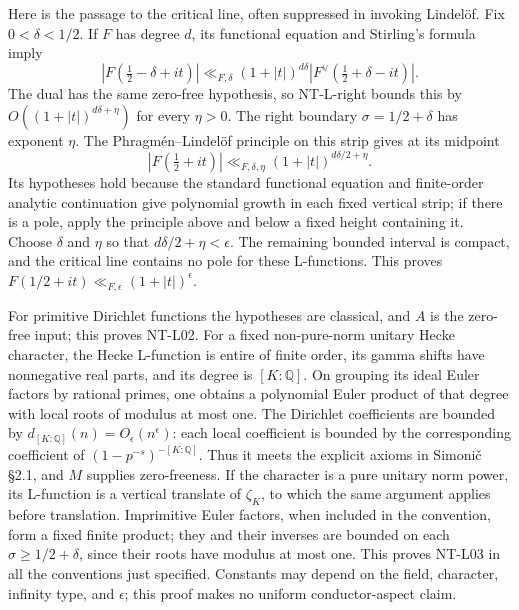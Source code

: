 \documentclass[11pt,a4paper]{article}
\begin{document}
Here is the passage to the critical line, often suppressed in invoking
Lindel\"of.  Fix $0<\delta<1/2$.  If $F$ has degree $d$, its functional
equation and Stirling's formula imply
\[
 |F(\tfrac12-\delta+it)|
 \ll_{F,\delta}(1+|t|)^{d\delta}
       |F^\vee(\tfrac12+\delta-it)|.
\]
The dual has the same zero-free hypothesis, so NT-L-right bounds this by
$O((1+|t|)^{d\delta+\eta})$ for every $\eta>0$.  The right boundary
$\sigma=1/2+\delta$ has exponent $\eta$.
The Phragm\'en--Lindel\"of principle on this strip gives at its midpoint
\[
 |F(\tfrac12+it)|\ll_{F,\delta,\eta}
                       (1+|t|)^{d\delta/2+\eta}.
\]
Its hypotheses hold because the standard functional equation and
finite-order analytic continuation give polynomial growth in each fixed
vertical strip; if there is a pole, apply the principle above and below
a fixed height containing it.  Choose $\delta$ and $\eta$ so that
$d\delta/2+\eta<\epsilon$.  The remaining bounded interval is compact,
and the critical line contains no pole for these L-functions.  This
proves $F(1/2+it)\ll_{F,\epsilon}(1+|t|)^\epsilon$.

For primitive Dirichlet functions the hypotheses are classical, and $A$
is the zero-free input; this proves NT-L02.  For a fixed non-pure-norm
unitary Hecke character, the Hecke L-function is entire of finite order,
its gamma shifts have nonnegative real parts, and its degree is
$[K:\mathbb Q]$.  On grouping its ideal Euler factors by rational primes,
one obtains a polynomial Euler product of that degree with local roots
of modulus at most one.  The Dirichlet coefficients are bounded by
$d_{[K:\mathbb Q]}(n)=O_\epsilon(n^\epsilon)$: each local coefficient
is bounded by the corresponding coefficient of $(1-p^{-s})^{-[K:\mathbb Q]}$.
Thus it meets the explicit axioms in Simoni\v c \S2.1, and $M$ supplies
zero-freeness.  If the character is a pure unitary norm power, its
L-function is a vertical translate of $\zeta_K$, to which the same
argument applies before translation.  Imprimitive Euler factors, when
included in the convention, form a fixed finite product; they and their
inverses are bounded on each $\sigma\ge1/2+\delta$, since their roots
have modulus at most one.  This proves NT-L03 in all the conventions just
specified.  Constants may depend on the field, character, infinity type,
and $\epsilon$; this proof makes no uniform conductor-aspect claim.
\end{document}
